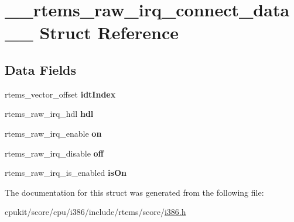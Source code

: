 \hypertarget{struct____rtems__raw__irq__connect__data____}{}\section{\+\_\+\+\_\+rtems\+\_\+raw\+\_\+irq\+\_\+connect\+\_\+data\+\_\+\+\_\+ Struct Reference}
\label{struct____rtems__raw__irq__connect__data____}
\subsection*{Data Fields}
\begin{DoxyCompactItemize}
\item 
\mbox{\label{struct____rtems__raw__irq__connect__data_____ab84ab6c3e182b626c38befa1ea215b62}} 
rtems\+\_\+vector\+\_\+offset {\bfseries idt\+Index}
\item 
\mbox{\label{struct____rtems__raw__irq__connect__data_____aff4fd2c43b744e9f66fb29e34e100242}} 
rtems\+\_\+raw\+\_\+irq\+\_\+hdl {\bfseries hdl}
\item 
\mbox{\label{struct____rtems__raw__irq__connect__data_____ab3ec113a30fcd1e986c114d2300e8d82}} 
rtems\+\_\+raw\+\_\+irq\+\_\+enable {\bfseries on}
\item 
\mbox{\label{struct____rtems__raw__irq__connect__data_____a9f2996120dad02fccd29d44106f8e2ed}} 
rtems\+\_\+raw\+\_\+irq\+\_\+disable {\bfseries off}
\item 
\mbox{\label{struct____rtems__raw__irq__connect__data_____aa38451b80d66a95d20872cc3d603432d}} 
rtems\+\_\+raw\+\_\+irq\+\_\+is\+\_\+enabled {\bfseries is\+On}
\end{DoxyCompactItemize}


The documentation for this struct was generated from the following file\+:\begin{DoxyCompactItemize}
\item 
cpukit/score/cpu/i386/include/rtems/score/\mbox{\hyperlink{i386_8h}{i386.\+h}}\end{DoxyCompactItemize}
